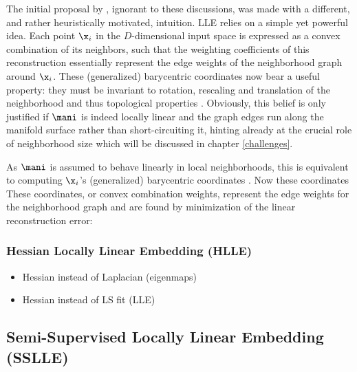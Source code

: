 The initial proposal by \citet{roweissaul2000}, ignorant to these discussions, 
was made with a different, and rather heuristically motivated, intuition.
LLE relies on a simple yet powerful idea.
Each point $\x_i$ in the $D$-dimensional input space is expressed as a convex 
combination of its neighbors, such that the weighting coefficients of this 
reconstruction essentially represent the edge weights of the neighborhood graph around $\x_i$. 
These (generalized) barycentric coordinates now bear a useful property: they 
must be invariant to rotation, rescaling and translation of the neighborhood and 
thus topological properties \citep{roweissaul2000}.
Obviously, this belief is only justified if $\mani$ is indeed locally linear and 
the graph edges run along the manifold surface rather than short-circuiting it, 
hinting already at the crucial role of neighborhood size which will be discussed 
in chapter \ref{challenges}.

As $\mani$ is assumed to behave linearly in local neighborhoods, this is 
equivalent to computing $\x_i$'s (generalized) barycentric coordinates 
\citep{wuwu2018}.
Now these coordinates  
These coordinates, or convex combination weights, represent the edge weights for 
the neighborhood graph and are found by minimization of the linear 
reconstruction error:
% 
%   


\subsubsection{Hessian Locally Linear Embedding (HLLE)}
\label{hlle}

\begin{itemize}
  \item Hessian instead of Laplacian (eigenmaps)
  \item Hessian instead of LS fit (LLE)
\end{itemize}


\subsection{Semi-Supervised Locally Linear Embedding (SSLLE)}
\label{sslle}

